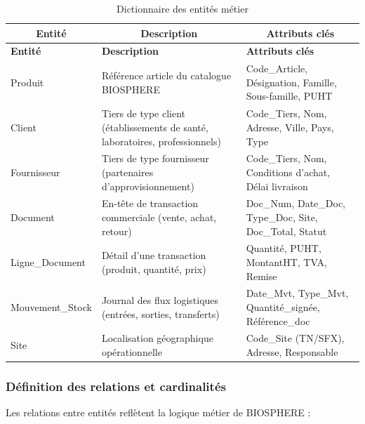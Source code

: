 {\small
\renewcommand{\arraystretch}{1.2}
\setlength{\tabcolsep}{4pt}


\begin{longtable}{|p{3cm}|p{5cm}|p{9cm}|}

\caption{Dictionnaire des entités métier} \\

\hline
\multicolumn{1}{|c|}{\textbf{Entité}} & 
\multicolumn{1}{c|}{\textbf{Description}} & 
\multicolumn{1}{c|}{\textbf{Attributs clés}} \\ 
\hline
\endfirsthead

\hline
\textbf{Entité} & \textbf{Description} & \textbf{Attributs clés} \\
\hline
\endhead

\hline
\endfoot

Produit & Référence article du catalogue BIOSPHERE & Code\_Article, Désignation, Famille, Sous-famille, PUHT \\
\hline

Client & Tiers de type client (établissements de santé, laboratoires, professionnels) & Code\_Tiers, Nom, Adresse, Ville, Pays, Type \\
\hline

Fournisseur & Tiers de type fournisseur (partenaires d'approvisionnement) & Code\_Tiers, Nom, Conditions d'achat, Délai livraison \\
\hline

Document & En-tête de transaction commerciale (vente, achat, retour) & Doc\_Num, Date\_Doc, Type\_Doc, Site, Doc\_Total, Statut \\
\hline

Ligne\_Document & Détail d'une transaction (produit, quantité, prix) & Quantité, PUHT, MontantHT, TVA, Remise \\
\hline

Mouvement\_Stock & Journal des flux logistiques (entrées, sorties, transferts) & Date\_Mvt, Type\_Mvt, Quantité\_signée, Référence\_doc \\
\hline

Site & Localisation géographique opérationnelle & Code\_Site (TN/SFX), Adresse, Responsable \\
\hline

\end{longtable}

}
\subsubsection{Définition des relations et cardinalités}
Les relations entre entités reflètent la logique métier de BIOSPHERE :


